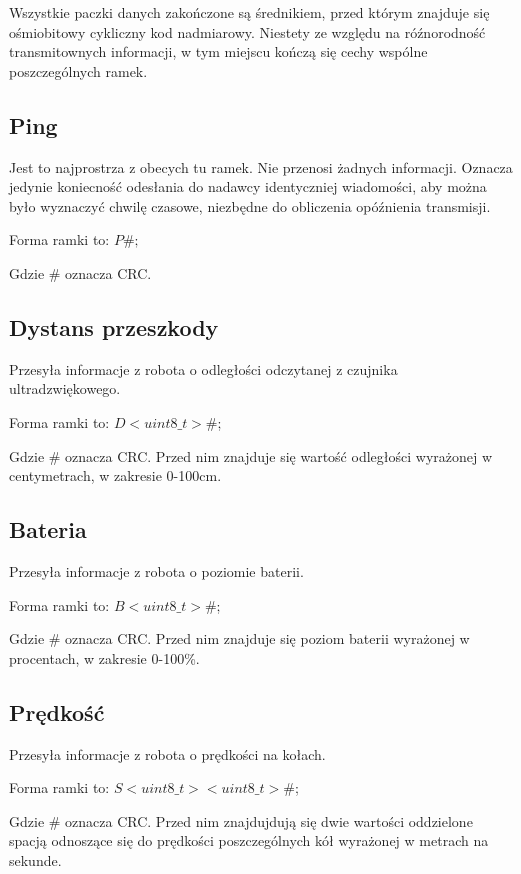 \documentclass[10pt, a4paper]{article}
\begin{document}
Wszystkie paczki danych zakończone są średnikiem, przed którym znajduje się
ośmiobitowy cykliczny kod nadmiarowy. Niestety ze względu na róźnorodność 
transmitownych informacji, w tym miejscu kończą się cechy wspólne poszczególnych 
ramek.

\subsection{Ping}
Jest to najprostrza z obecych tu ramek. Nie przenosi żadnych informacji.
Oznacza jedynie koniecność odesłania do nadawcy identyczniej wiadomości,
aby można było wyznaczyć chwilę czasowe, niezbędne do obliczenia opóźnienia
transmisji.

Forma ramki to: $P\#;$

Gdzie \# oznacza CRC.



\subsection{Dystans przeszkody}
Przesyła informacje z robota o odległości odczytanej z czujnika ultradzwiękowego.

Forma ramki to: $D<uint8\_t>\#$;
\newline

Gdzie \# oznacza CRC. Przed nim znajduje się wartość odległości wyrażonej 
w centymetrach, w zakresie 0-100cm.



\subsection{Bateria}
Przesyła informacje z robota o poziomie baterii.

Forma ramki to: $B<uint8\_t>\#$;
\newline

Gdzie \# oznacza CRC. Przed nim znajduje się poziom baterii wyrażonej 
w procentach, w zakresie 0-100\%.



\subsection{Prędkość}
Przesyła informacje z robota o prędkości na kołach.

Forma ramki to: $S<uint8\_t> <uint8\_t>\#$;
\newline

Gdzie \# oznacza CRC. Przed nim znajdujdują się dwie wartości oddzielone spacją
odnoszące się do prędkości poszczególnych kół wyrażonej w metrach na sekunde.
\end{document}
